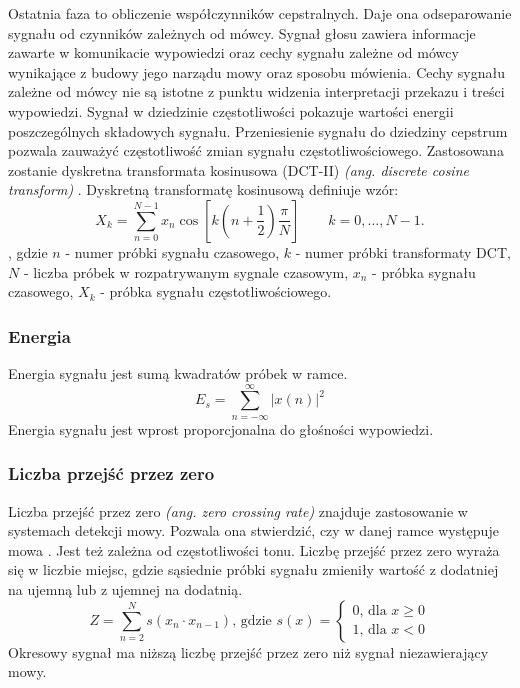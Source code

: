\documentclass[a4paper,12pt,twoside,openany]{report}
\newcommand{\ang}[1]{\textit{(ang. #1)}}
\begin{document}
Ostatnia faza to obliczenie współczynników cepstralnych.
Daje ona odseparowanie sygnału od czynników zależnych od mówcy.
Sygnał głosu zawiera informacje zawarte w komunikacie wypowiedzi oraz 
cechy sygnału zależne od mówcy wynikające z budowy jego narządu mowy oraz sposobu mówienia.
Cechy sygnału zależne od mówcy nie są istotne z punktu widzenia interpretacji przekazu i treści wypowiedzi.
Sygnał w dziedzinie częstotliwości pokazuje wartości energii poszczególnych składowych sygnału.
Przeniesienie sygnału do dziedziny cepstrum pozwala zauważyć częstotliwość zmian sygnału częstotliwościowego.
Zastosowana zostanie dyskretna transformata kosinusowa (DCT-II) \ang{discrete cosine transform} \cite{Hossan2013}.
Dyskretną transformatę kosinusową definiuje wzór:
\begin{equation}
	X_k =
	 \sum_{n=0}^{N-1} x_n \cos \left[k \left(n+\frac{1}{2}\right) \frac{\pi}{N} \right] \quad \quad k = 0, \dots, N-1.
\end{equation}, gdzie
$n$ - numer próbki sygnału czasowego,
$k$ - numer próbki transformaty DCT,
$N$ - liczba próbek w rozpatrywanym sygnale czasowym,
$x_n$ - próbka sygnału czasowego,
$X_k$ - próbka sygnału częstotliwościowego.


\subsubsection{Energia}
Energia sygnału jest sumą kwadratów próbek w ramce.
\begin{equation}
	E_{s}=\sum _{n=-\infty }^{\infty }{|x(n)|^{2}}
	\label{eq:energy}
\end{equation}
Energia sygnału jest wprost proporcjonalna do głośności wypowiedzi.
\subsubsection{Liczba przejść przez zero}
Liczba przejść przez zero \ang{zero crossing rate} znajduje zastosowanie w systemach detekcji mowy.
Pozwala ona stwierdzić, czy w danej ramce występuje mowa \cite{Walters-Williams2010}.
Jest też zależna od częstotliwości tonu. 
Liczbę przejść przez zero wyraża się w liczbie miejsc, gdzie sąsiednie próbki sygnału zmieniły wartość z dodatniej na ujemną lub z ujemnej na dodatnią.
\begin{equation}
	Z = \sum_{n=2}^{N}s(x_n \cdot x_{n-1})\text{, gdzie } s(x) = 
	\begin{cases} 
		0 \text{, dla } x \geq 0 \\
		1 \text{, dla } x < 0
	\end{cases}
	\label{eq:zcr}
\end{equation}
Okresowy sygnał ma niższą liczbę przejść przez zero niż sygnał niezawierający mowy\cite{Walters-Williams2010}.
\end{document}
